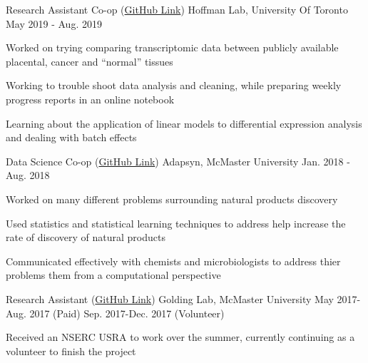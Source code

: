 \begin{cventries}
    \cventry
      {Research Assistant Co-op (\href{https://hoffmanlab.org/}{GitHub Link})}
      {Hoffman Lab, University Of Toronto}
      {May 2019 - Aug. 2019}
      {}
      {
        \begin{cvitems}
         \item {Worked on trying comparing transcriptomic data between publicly available placental, cancer and ``normal'' tissues}
         \item {Working to trouble shoot data analysis and cleaning, while preparing weekly progress reports in an online notebook}
         \item {Learning about the application of linear models to differential expression analysis and dealing with batch effects}
        \end{cvitems}
      }
    \cventry
      {Data Science Co-op (\href{https://github.com/Adapsyn}{GitHub Link})}
      {Adapsyn, McMaster University}
      {Jan. 2018 - Aug. 2018}
      {}
      {
        \begin{cvitems}
         \item {Worked on many different problems surrounding natural products discovery}
         \item {Used statistics and statistical learning techniques to address help increase the rate of discovery of natural products}
         \item {Communicated effectively with chemists and microbiologists to address thier problems them from a computational perspective}
        \end{cvitems}
      }
    \cventry
      {Research Assistant (\href{https://github.com/DJSiddharthVader/summer2017}{GitHub Link})}
      {Golding Lab, McMaster University}
      {May 2017-Aug. 2017 (Paid)}
      {Sep. 2017-Dec. 2017 (Volunteer)}
      {
        \begin{cvitems}
          \item {Received an NSERC USRA to work over the summer, currently continuing as a volunteer to finish the project}

\end{cvitems}}
\end{cventries}
